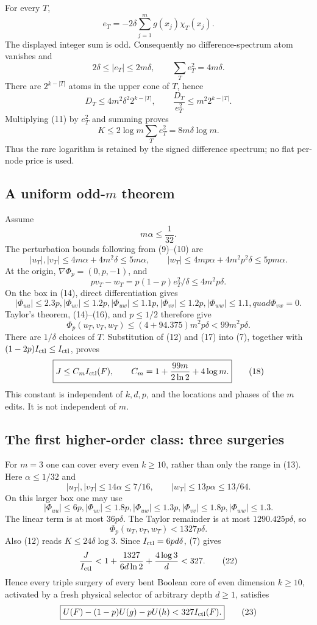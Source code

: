 For every $T$,
\[
 e_T=-2\delta\sum_{j=1}^m g(x_j)\chi_T(x_j).             \tag{9}
\]
The displayed integer sum is odd.  Consequently no difference-spectrum
atom vanishes and
\[
 2\delta\le |e_T|\le2m\delta,
 \qquad \sum_Te_T^2=4m\delta.                            \tag{10}
\]
There are $2^{k-|T|}$ atoms in the upper cone of $T$, hence
\[
 D_T\le4m^2\delta^2 2^{k-|T|},\qquad
 \frac{D_T}{e_T^2}\le m^2 2^{k-|T|}.                    \tag{11}
\]
Multiplying (11) by $e_T^2$ and summing proves
\[
 K\le2\log m\sum_Te_T^2=8m\delta\log m.                \tag{12}
\]
Thus the rare logarithm is retained by the signed difference spectrum; no
flat per-node price is used.

\subsection*{A uniform odd-$m$ theorem}

Assume
\[
 m\alpha\le\frac1{32}.                                   \tag{13}
\]
The perturbation bounds following from (9)--(10) are
\[
 |u_T|,|v_T|\le4m\alpha+4m^2\delta\le5m\alpha,
 \qquad |w_T|\le4mp\alpha+4m^2p^2\delta\le5pm\alpha.
\tag{14}
\]
At the origin, $\nabla\Phi_p=(0,p,-1)$, and
\[
 pv_T-w_T=p(1-p)e_T^2/\delta\le4m^2p\delta.              \tag{15}
\]
On the box in (14), direct differentiation gives
\[
 |\Phi_{uu}|\le2.3p, |\Phi_{uv}|\le1.2p,
 |\Phi_{uw}|\le1.1p, |\Phi_{vv}|\le1.2p,
 |\Phi_{ww}|\le1.1,quad \Phi_{vw}=0.                  \tag{16}
\]
Taylor's theorem, (14)--(16), and $p\le1/2$ therefore give
\[
 \Phi_p(u_T,v_T,w_T)
 \le(4+94.375)m^2p\delta<99m^2p\delta.                 \tag{17}
\]
There are $1/\delta$ choices of $T$.  Substitution of (12) and (17)
into (7), together with $(1-2p)I_{\rm ctl}\le I_{\rm ctl}$, proves
\[
 \boxed{
 J\le C_m I_{\rm ctl}(F),\qquad
 C_m=1+\frac{99m}{2\ln2}+4\log m.}
\tag{18}
\]
This constant is independent of $k,d,p$, and the locations and phases of
the $m$ edits.  It is not independent of $m$.

\subsection*{The first higher-order class: three surgeries}

For $m=3$ one can cover every even $k\ge10$, rather than only the range
in (13).  Here $\alpha\le1/32$ and
\[
 |u_T|,|v_T|\le14\alpha\le7/16,
 \qquad |w_T|\le13p\alpha\le13/64.                       \tag{19}
\]
On this larger box one may use
\[
 |\Phi_{uu}|\le6p, |\Phi_{uv}|\le1.8p,
 |\Phi_{uw}|\le1.3p, |\Phi_{vv}|\le1.8p,
 |\Phi_{ww}|\le1.3.                                     \tag{20}
\]
The linear term is at most $36p\delta$.  The Taylor remainder is at most
$1290.425p\delta$, so
\[
 \Phi_p(u_T,v_T,w_T)<1327p\delta.                        \tag{21}
\]
Also (12) reads $K\le24\delta\log3$.  Since
$I_{\rm ctl}=6pd\delta$, (7) gives
\[
 \frac{J}{I_{\rm ctl}}
 <1+\frac{1327}{6d\ln2}+\frac{4\log3}{d}<327.            \tag{22}
\]
Hence every triple surgery of every bent Boolean core of even dimension
$k\ge10$, activated by a fresh physical selector of arbitrary depth
$d\ge1$, satisfies
\[
 \boxed{U(F)-(1-p)U(g)-pU(h)<327 I_{\rm ctl}(F).}         \tag{23}
\]


